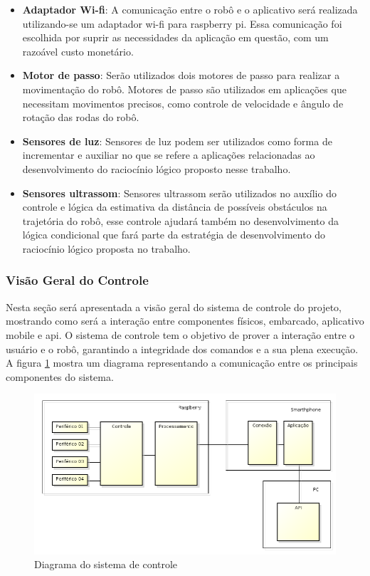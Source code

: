 \begin{itemize}
  \item \textbf{Adaptador Wi-fi}: A comunicação entre o robô e o aplicativo será realizada utilizando-se um adaptador wi-fi para raspberry pi. Essa comunicação foi escolhida por suprir as necessidades da aplicação em questão, com um razoável custo monetário.
  \item \textbf{Motor de passo}: Serão utilizados dois motores de passo para realizar a movimentação do robô. Motores de passo são utilizados em aplicações que necessitam movimentos precisos, como controle de velocidade e ângulo de rotação das rodas do robô.
  \item \textbf{Sensores de luz}: Sensores de luz podem ser utilizados como forma de incrementar e auxiliar no que se refere a aplicações relacionadas ao desenvolvimento do raciocínio lógico proposto nesse trabalho.
  \item \textbf{Sensores ultrassom}: Sensores ultrassom serão utilizados no auxílio do controle e lógica da estimativa da distância de possíveis obstáculos na trajetória do robô, esse controle ajudará também no desenvolvimento da lógica condicional que fará parte da estratégia de desenvolvimento do raciocínio lógico proposta no trabalho.
\end{itemize}

\subsubsection{Visão Geral do Controle}

Nesta seção será apresentada a visão geral do sistema de controle do projeto, mostrando como será a interação entre componentes físicos, embarcado, aplicativo mobile e api.
O sistema de controle tem o objetivo de prover a interação entre o usuário e o robô, garantindo a integridade dos comandos e a sua plena execução. A figura \ref{sys:ctlr} mostra um diagrama representando a comunicação entre os principais componentes do sistema.
\begin{figure}[H]
  \centering
  \includegraphics[width=.9\textwidth]{edit/img/visao_geral_controle.png}
  \caption{Diagrama do sistema de controle}
  \label{sys:ctlr}
\end{figure}


